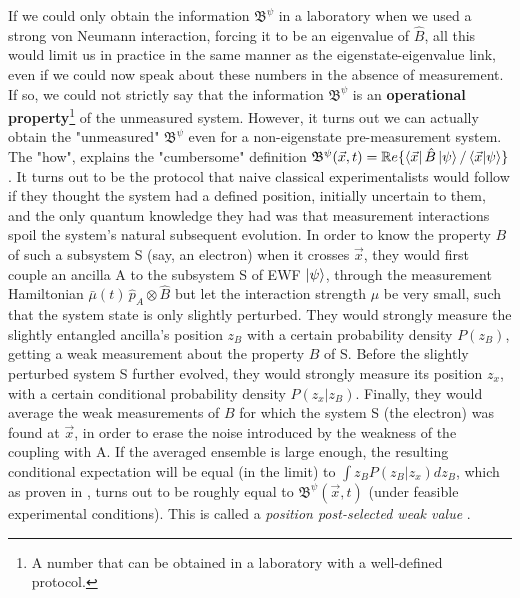 \documentclass[11pt, a4paper]{article} %
\newcommand{\B}{\mathfrak{B}}
\begin{document}
If we could only obtain the information $\B^\psi$ in a laboratory when we used a strong von Neumann interaction, forcing it to be an eigenvalue of $\hat{B}$, all this would limit us in practice in the same manner as the eigenstate-eigenvalue link, even if we could now speak about these numbers in the absence of measurement. If so, we could not strictly say that the information $\B^\psi$ is an {\bf operational property}\footnote{A number that can be obtained in a laboratory with a well-defined protocol.} of the unmeasured system. However, it turns out we can actually obtain the "unmeasured" $\B^\psi$ even for a non-eigenstate pre-measurement system. The "how", explains the "cumbersome" definition $\B^\psi(\vec{x},t)=\mathbb{R}e\{\bra{\vec{x}}\hat{B}\ket{\psi}/\bra{\vec{x}}\ket{\psi}\}$. It turns out to be the protocol that naive classical experimentalists \cite{WisemanVel} would follow if they thought the system had a defined position, initially uncertain to them, and the only quantum knowledge they had was that measurement interactions spoil the system's natural subsequent evolution. In order to know the property $B$ of such a subsystem S (say, an electron) when it crosses $\vec{x}$, they would first couple an ancilla A to the subsystem S of EWF $\ket{\psi}$, through the measurement Hamiltonian $\bar{\mu}(t)\,\hat{p}_A\otimes\hat{B}$ but let the interaction strength $\mu$ be very small, such that the system state is only slightly perturbed. They would strongly measure the slightly entangled ancilla's position $z_B$ with a certain probability density $P(z_B)$, getting a weak measurement about the property $B$ of S. Before the slightly perturbed system S further evolved, they would strongly measure its position $z_x$, with a certain conditional probability density $P(z_x|z_B)$. Finally, they would average the weak measurements of $B$ for which the system S (the electron) was found at $\vec{x}$, in order to erase the noise introduced by the weakness of the coupling with A. If the averaged ensemble is large enough, the resulting conditional expectation will be equal (in the limit) to $\int z_B P(z_B|z_x)dz_B$, which as proven in \cite{DevInPosition2}, turns out to be roughly equal to $\B^\psi(\vec{x},t)$ (under feasible experimental conditions). This is called a {\em position post-selected weak value} \cite{Weak}.
\end{document}
